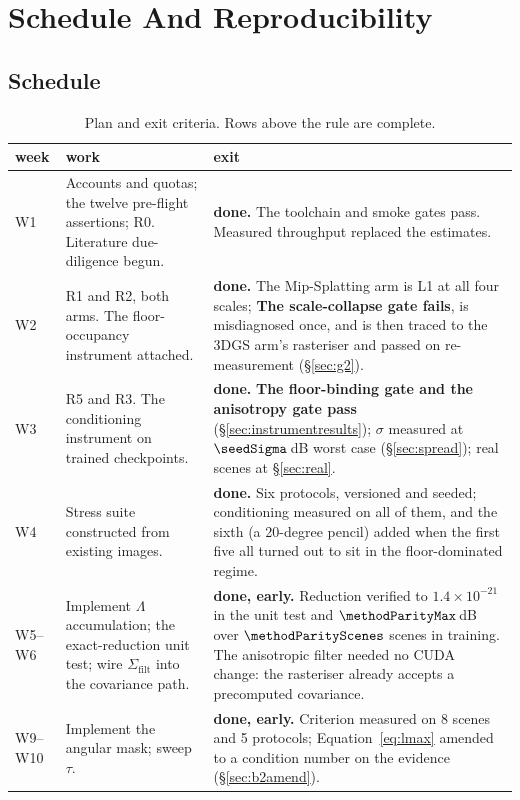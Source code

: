 \chapter{Schedule And Reproducibility}
\label{ch:plan}

\section{Schedule}
\begin{table}[htbp]
  \centering
  \caption{Plan and exit criteria. Rows above the rule are complete.}
  \label{tab:schedule}
  \small
  \begin{tabularx}{\linewidth}{L{0.45}L{1.40}L{1.15}}
    \toprule
    week & work & exit \\
    \midrule
    W1 & Accounts and quotas; the twelve pre-flight assertions; R0. Literature due-diligence begun. & \textbf{done.} The toolchain and smoke gates pass. Measured throughput replaced
    the estimates. \\
    W2 & R1 and R2, both arms. The floor-occupancy instrument attached. & \textbf{done.} The Mip-Splatting arm is L1 at all four scales; \textbf{The scale-collapse gate fails}, is misdiagnosed once, and is then traced to the 3DGS arm's rasteriser and passed on re-measurement (\S\ref{sec:g2}). \\
    W3 & R5 and R3. The conditioning instrument on trained checkpoints. & \textbf{done.} \textbf{The floor-binding gate and the anisotropy gate pass} (\S\ref{sec:instrumentresults}); $\sigma$ measured at $\seedSigma$\,dB worst case (\S\ref{sec:spread}); real scenes at \S\ref{sec:real}. \\
    W4 & Stress suite constructed from existing images. & \textbf{done.} Six protocols, versioned and seeded; conditioning measured on all of them, and the sixth (a 20-degree pencil) added when the first five all turned out to sit in the floor-dominated regime. \\
    \midrule
    W5--W6 & Implement $\Lambda$ accumulation; the exact-reduction unit test; wire $\Sigma_{\mathrm{filt}}$ into the covariance path. & \textbf{done, early.} Reduction verified to $1.4\times10^{-21}$ in the unit test and $\methodParityMax$\,dB over $\methodParityScenes$ scenes in training. The anisotropic filter needed no CUDA change: the rasteriser already accepts a precomputed covariance. \\
    W9--W10 & Implement the angular mask; sweep $\tau$. & \textbf{done, early.} Criterion measured on 8 scenes and 5 protocols; Equation~\eqref{eq:lmax} amended to a condition number on the evidence (\S\ref{sec:b2amend}). \\

\end{tabularx}
\end{table}

